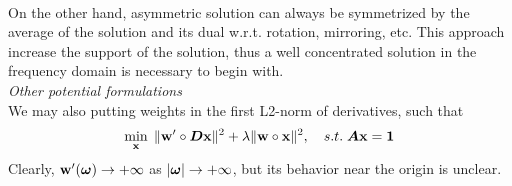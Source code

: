 \\
On the other hand, asymmetric solution can always be symmetrized by the average of the solution and its dual
w.r.t. rotation, mirroring, etc. This approach increase the support of the solution, thus a well concentrated solution in the frequency domain is necessary to begin with.
\\[1em]
{\it Other potential formulations}\\
We may also putting weights in the first L2-norm of derivatives, such that
\begin{align}
\min_{\mathbf{x}}\; \Vert \mathbf{w}'\circ \boldsymbol{D}\mathbf{x}\Vert^2 + \lambda\Vert \mathbf{w}\circ\mathbf{x}\Vert^2,\quad s.t. \; \boldsymbol{A}\mathbf{x} = \mathbf{1} \label{eq: opt-2d-double-weight}
\end{align}
Clearly, $\mathbf{w}'(\boldsymbol{\omega})\rightarrow +\infty$ as $|\boldsymbol{\omega}|\rightarrow +\infty$, but its behavior near the origin is unclear.
